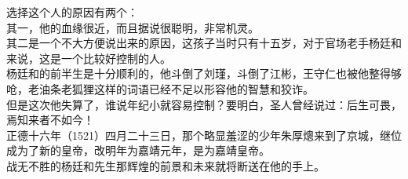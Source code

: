 \begin{multicols}{\theparacolNo}
选择这个人的原因有两个：\\

其一，他的血缘很近，而且据说很聪明，非常机灵。\\

其二是一个不大方便说出来的原因，这孩子当时只有十五岁，对于官场老手杨廷和来说，这是一个比较好控制的人。\\

杨廷和的前半生是十分顺利的，他斗倒了刘瑾，斗倒了江彬，王守仁也被他整得够呛，老油条老狐狸这样的词语已经不足以形容他的智慧和狡诈。\\

但是这次他失算了，谁说年纪小就容易控制？要明白，圣人曾经说过：后生可畏，焉知来者不如今！\\

正德十六年（1521）四月二十三日，那个略显羞涩的少年朱厚熜来到了京城，继位成为了新的皇帝，改明年为嘉靖元年，是为嘉靖皇帝。\\

战无不胜的杨廷和先生那辉煌的前景和未来就将断送在他的手上。\\
\ifnum{}
	\end{multicols}
\fi